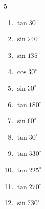 \begin{multicols}{5}
\begin{enumerate}

  \item $\displaystyle \tan{30^\circ}$


  \item $\displaystyle \sin{240^\circ}$


  \item $\displaystyle \sin{135^\circ}$


  \item $\displaystyle \cos{30^\circ}$


  \item $\displaystyle \sin{30^\circ}$


  \item $\displaystyle \tan{180^\circ}$

        \phantom{$\displaystyle =0$}

  \item $\displaystyle \sin{60^\circ}$


  \item $\displaystyle \tan{30^\circ}$


  \item $\displaystyle \tan{330^\circ}$


  \item $\displaystyle \tan{225^\circ}$

        \phantom{$\displaystyle =1$}

  \item $\displaystyle \tan{270^\circ}$

        \phantom{$\displaystyle なし$}

  \item $\displaystyle \sin{330^\circ}$



\end{enumerate}
\end{multicols}
